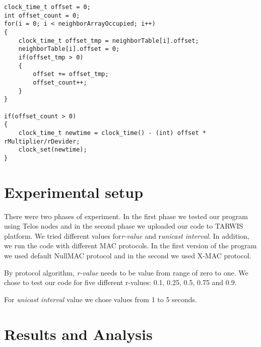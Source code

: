 \documentclass{llncs}
\begin{document}
\begin{lstlisting}
clock_time_t offset = 0;	
int offset_count = 0;
for(i = 0; i < neighborArrayOccupied; i++)
{
	clock_time_t offset_tmp = neighborTable[i].offset;
	neighborTable[i].offset = 0;
	if(offset_tmp > 0)
	{
		offset += offset_tmp;
		offset_count++;
	}
}
	
if(offset_count > 0)
{
	clock_time_t newtime = clock_time() - (int) offset * rMultiplier/rDevider;
	clock_set(newtime);
}

\end{lstlisting}

\begin{comment}
Experimental setup/Measurement procedure: The experimental setup, the
differences of the experimental series, the different parameters used, including local
sensor setup and TARWIS testbed.
\end{comment}
\section{Experimental setup}
There were two phases of experiment. In the first phase we tested our program using Telos nodes and in the second phase we uploaded our code to TARWIS platform. We tried different values for\textit{r-value} and r\textit{unicast interval}. In addition, we run the code with different MAC protocols. In the first version of the program we used default NullMAC protocol and in the second we used X-MAC protocol. 

By protocol algorithm, \textit{r-value} needs to be value from range of zero to one. We chose to test our code for five different r-values: 0.1, 0.25, 0.5, 0.75 and 0.9. 

For \textit{unicast interval} value we chose values from 1 to 5 seconds. 

\begin{comment}
Results and Analysis: Analyse the results which are obtained by local sensors and
on TARWIS testbed. Analyse your data with respect to the aim of the experiment. Your
task during the experiment is not just to measure and document your measurements, but
to derive and present conclusions from your measurements.
\end{comment}

\section{Results and Analysis}

\begin{comment}
Conclusions: Summarize and discuss your results with respect to the literature or
your own scientific expectations. You should in particular discuss possible error sources
and give a short judgement on the quality of the experimental setup (because you also
learn to design the measurement setups). If needed, suggest how to improve the setups.
\end{comment}
\end{document}
